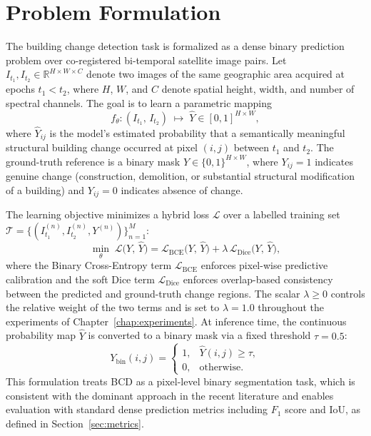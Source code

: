\section{Problem Formulation}
\label{sec:problem-notation}

The building change detection task is formalized as a dense binary prediction problem over co-registered bi-temporal satellite image pairs. Let $I_{t_1}, I_{t_2} \in \mathbb{R}^{H \times W \times C}$ denote two images of the same geographic area acquired at epochs $t_1 < t_2$, where $H$, $W$, and $C$ denote spatial height, width, and number of spectral channels. The goal is to learn a parametric mapping
\begin{equation}
f_\theta : (I_{t_1},\, I_{t_2}) \;\longmapsto\; \hat{Y} \in [0,1]^{H \times W},
\label{eq:problem_mapping}
\end{equation}
where $\hat{Y}_{ij}$ is the model's estimated probability that a semantically meaningful structural building change occurred at pixel $(i,j)$ between $t_1$ and $t_2$. The ground-truth reference is a binary mask $Y \in \{0,1\}^{H \times W}$, where $Y_{ij}=1$ indicates genuine change (construction, demolition, or substantial structural modification of a building) and $Y_{ij}=0$ indicates absence of change.

The learning objective minimizes a hybrid loss $\mathcal{L}$ over a labelled training set $\mathcal{T} = \{(I_{t_1}^{(n)}, I_{t_2}^{(n)}, Y^{(n)})\}_{n=1}^{M}$:
\begin{equation}
\min_{\theta}\;\mathcal{L}\bigl(Y,\,\hat{Y}\bigr)
    = \mathcal{L}_{\mathrm{BCE}}\bigl(Y,\,\hat{Y}\bigr)
    + \lambda\,\mathcal{L}_{\mathrm{Dice}}\bigl(Y,\,\hat{Y}\bigr),
\label{eq:training_objective}
\end{equation}
where the Binary Cross-Entropy term $\mathcal{L}_{\mathrm{BCE}}$ enforces pixel-wise predictive calibration and the soft Dice term $\mathcal{L}_{\mathrm{Dice}}$ enforces overlap-based consistency between the predicted and ground-truth change regions. The scalar $\lambda \geq 0$ controls the relative weight of the two terms and is set to $\lambda = 1.0$ throughout the experiments of Chapter~\ref{chap:experiments}. At inference time, the continuous probability map $\hat{Y}$ is converted to a binary mask via a fixed threshold $\tau = 0.5$:
\begin{equation}
Y_{\mathrm{bin}}(i,j) =
\begin{cases}
1, & \hat{Y}(i,j) \geq \tau, \\
0, & \text{otherwise.}
\end{cases}
\label{eq:threshold}
\end{equation}
This formulation treats \ac{BCD} as a pixel-level binary segmentation task, which is consistent with the dominant approach in the recent literature \cite{Bandara2022ChangeFormer, Fang2021SNUNetCD, Zhang2020FusionNetDSIFN} and enables evaluation with standard dense prediction metrics including $F_1$ score and \ac{IoU}, as defined in Section~\ref{sec:metrics}.


